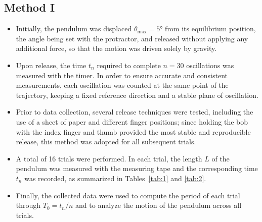 \documentclass[11pt,a4paper]{article}
\begin{document}
\subsection*{Method I}
\begin{itemize}
  \item Initially, the pendulum was displaced $\theta_{\max} = \ang{5}$ from
        its equilibrium position, the angle being set with the protractor,
        and released without applying any additional force, so that the
        motion was driven solely by gravity.
  \item Upon release, the time $t_n$ required to complete $n = 30$
        oscillations was measured with the timer. In order to ensure
        accurate and consistent measurements, each oscillation was counted
        at the same point of the trajectory, keeping a fixed reference
        direction and a stable plane of oscillation.
  \item Prior to data collection, several release techniques were tested,
        including the use of a sheet of paper and different finger
        positions; since holding the bob with the index finger and thumb
        provided the most stable and reproducible release, this method was
        adopted for all subsequent trials.
  \item A total of 16 trials were performed. In each trial, the length $L$
        of the pendulum was measured with the measuring tape and the
        corresponding time $t_n$ was recorded, as summarized in Tables~\ref{tab:1} and \ref{tab:2}.
  \item Finally, the collected data were used to compute the period of
        each trial through $T_0 = t_n/n$ and to analyze the motion of the
        pendulum across all trials.
\end{itemize}
\end{document}
